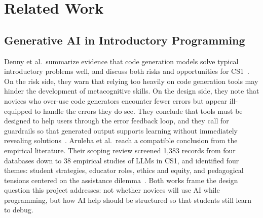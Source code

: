 \documentclass[manuscript,review]{acmart}
\begin{document}
\section{Related Work}
\label{sec:related}

\subsection{Generative AI in Introductory Programming}
Denny et al.\ summarize evidence that code generation models solve typical introductory problems well, and discuss both risks and opportunities for CS1~\cite{denny2024era}. On the risk side, they warn that relying too heavily on code generation tools may hinder the development of metacognitive skills. On the design side, they note that novices who over-use code generators encounter fewer errors but appear ill-equipped to handle the errors they do see. They conclude that tools must be designed to help users through the error feedback loop, and they call for guardrails so that generated output supports learning without immediately revealing solutions~\cite{denny2024era}. Aruleba et al.\ reach a compatible conclusion from the empirical literature. Their scoping review screened 1,383 records from four databases down to 38 empirical studies of LLMs in CS1, and identified four themes: student strategies, educator roles, ethics and equity, and pedagogical tensions centered on the assistance dilemma~\cite{aruleba2025scoping}. Both works frame the design question this project addresses: not whether novices will use AI while programming, but how AI help should be structured so that students still learn to debug.
\end{document}
